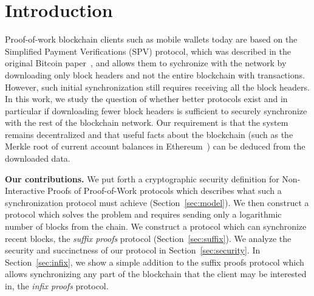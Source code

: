 \section{Introduction}

Proof-of-work blockchain clients such as mobile wallets today are based on the
Simplified Payment Verifications (SPV) protocol, which was described in the
original Bitcoin paper~\cite{bitcoin}, and allows them to sychronize with the
network by downloading only block headers and not the entire blockchain with
transactions. However, such initial synchronization still requires receiving all
the block headers. In this work, we study the question of whether better
protocols exist and in particular if downloading fewer block headers is
sufficient to securely synchronize with the rest of the blockchain network. Our
requirement is that the system remains decentralized and that useful facts about
the blockchain (such as the Merkle root of current account balances in
Ethereum~\cite{wood,vitalik}) can be deduced from the downloaded data.

\noindent\textbf{Our contributions.}
We put forth a cryptographic security definition for
Non-Interactive Proofs of Proof-of-Work protocols which describes what such a
synchronization protocol must achieve (Section~\ref{sec:model}). We then
construct a protocol which solves the problem and requires sending only a
logarithmic number of blocks from the chain. We construct a protocol which can
synchronize recent blocks, the \emph{suffix proofs} protocol
(Section~\ref{sec:suffix}).
We analyze the security and succinctness of
our protocol in Section~\ref{sec:security}.
In Section~\ref{sec:infix}, we show a simple addition to the suffix proofs protocol
which allows synchronizing any part of the blockchain that the client may be
interested in, the \emph{infix proofs} protocol.


%
%
%

